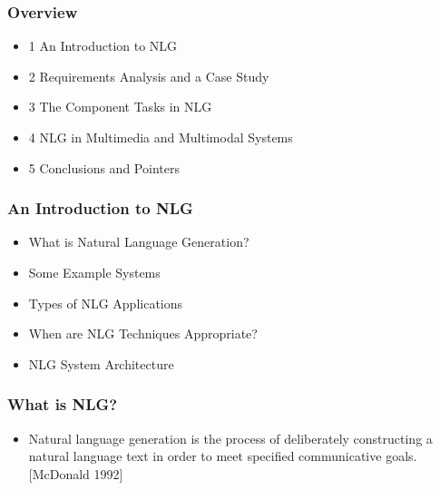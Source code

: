 \documentclass[compress,color=usenames]{beamer}
\begin{document}
\begin{frame}
\frametitle{Overview}

\label{f6}
\begin{itemize}
\item { {1 An Introduction to NLG}}
\item { {2 Requirements Analysis and a Case Study}}
\item { {3 The Component Tasks in NLG}}
\item { {4 NLG in Multimedia and Multimodal Systems}}
\item { {5 Conclusions and Pointers}}
\end{itemize}


\end{frame}

\begin{frame}
\frametitle{An Introduction to NLG}

\label{f8}
\begin{itemize}
\item { {What is Natural Language Generation?}}
\item { {Some Example Systems}}
\item { {Types of NLG Applications}}
\item { {When are NLG Techniques Appropriate?}}
\item { {NLG System Architecture}}
\end{itemize}


\end{frame}

\begin{frame}
\frametitle{What is NLG?}

\label{f10}
\begin{itemize}
\item { {Natural language generation is the process of deliberately constructing a natural language text in order to meet specified communicative goals.}}\\

\hfill [McDonald 1992]
\end{itemize}


\end{frame}
\end{document}
